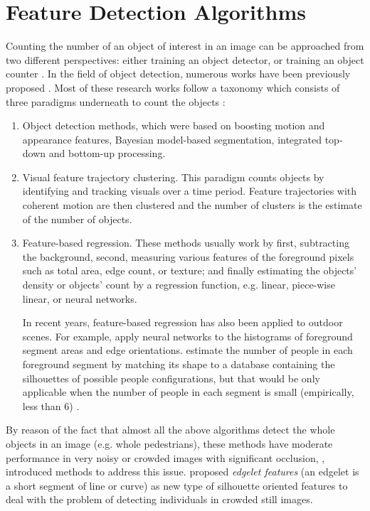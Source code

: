 \section{Feature Detection Algorithms} 
\label{fda}
Counting the number of an object of interest in an image can be approached from two different perspectives: either training an object detector, or training an object counter \cite{segui2015learning}. In the field of object detection, numerous works have been previously proposed \cite{davies1995crowd, kong2005counting, marana1998efficacy}. Most of these research works follow a taxonomy which consists of three paradigms underneath to count the objects \cite{chan2008privacy}:

\begin{enumerate}
	\item Object detection methods, which were based on boosting motion and appearance features, Bayesian model-based segmentation, integrated top-down and bottom-up processing.
	\item Visual feature trajectory clustering. This paradigm counts objects by identifying and tracking visuals over a  time period. Feature trajectories with coherent motion are then clustered and the number of clusters is the estimate of the number of objects. 

	\item Feature-based regression. These methods usually work by first, subtracting the background, second, measuring various features of the foreground pixels such as total area, edge count, or texture; and finally estimating the objects' density or objects' count by a regression function, e.g. linear, piece-wise linear, or neural networks. 

	\indent In recent years, feature-based regression has also been applied to outdoor scenes. For example, \citealt{kong2005counting} apply neural networks to the histograms of foreground segment areas and edge orientations. \citealt{dong2007fast} estimate the number of people in each foreground segment by matching its shape to a database containing the silhouettes of possible people configurations, but that would be only applicable when the number of people in each segment is small (empirically, less than 6) \cite{chan2008privacy}.  
\end{enumerate} 
By reason of the fact that almost all the above algorithms detect the whole objects in an image (e.g. whole pedestrians), these methods have moderate performance in very noisy or crowded images with significant occlusion, \citealt*{wu2005detection, lin2001estimation}, introduced methods to address this issue. \citealt*{wu2005detection} proposed \textit{edgelet features} (an edgelet is a short segment of line or curve) as new type of silhouette oriented features to deal with the problem of detecting individuals in crowded still images. %

